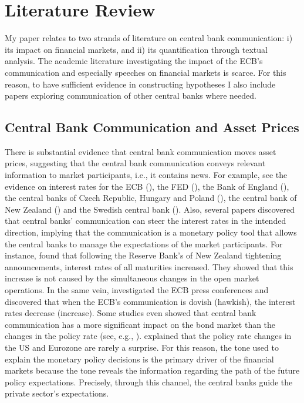\section{Literature Review}
My paper relates to two strands of literature on central bank communication: i) its impact on financial markets, and ii) its quantification through textual analysis. The academic literature investigating the impact of the ECB’s communication and especially speeches on financial markets is scarce. For this reason, to have sufficient evidence in constructing hypotheses I also include papers exploring communication of other central banks where needed.

\subsection{Central Bank Communication and Asset Prices}
There is substantial evidence that central bank communication moves asset prices, suggesting that the central bank communication conveys relevant information to market participants, i.e., it contains news. For example, see the evidence on interest rates for the ECB (\cite{ehrmann2007, schmeling2019, rosa2007,brand2010,rosa2011,lamla2011}), the FED (\cite{kohn2003,gurkaynak2004,lucca2009}), the Bank of England (\cite{reeves2007}), the central banks of Czech Republic, Hungary and Poland (\cite{rozkrut2007}), the central bank of New Zealand (\cite{guthrie2000}) and the Swedish central bank (\cite{andersson2006}). Also, several papers discovered that central banks’ communication can steer the interest rates in the intended direction, implying that the communication is a monetary policy tool that allows the central banks to manage the expectations of the market participants. For instance, \textcite{guthrie2000} found that following the Reserve Bank’s of New Zealand tightening announcements, interest rates of all maturities increased. They showed that this increase is not caused by the simultaneous changes in the open market operations. In the same vein, \textcite{rosa2007} investigated the ECB press conferences and discovered that when the ECB’s communication is dovish (hawkish), the interest rates decrease (increase). Some studies even showed that central bank communication has a more significant impact on the bond market than the changes in the policy rate (see, e.g., \cite{gurkaynak2004,rosa2011}). \textcite{gurkaynak2004} explained that the policy rate changes in the US and Eurozone are rarely a surprise. For this reason, the tone used to explain the monetary policy decisions is the primary driver of the financial markets because the tone reveals the information regarding the path of the future policy expectations. Precisely, through this channel, the central banks guide the private sector's expectations.


